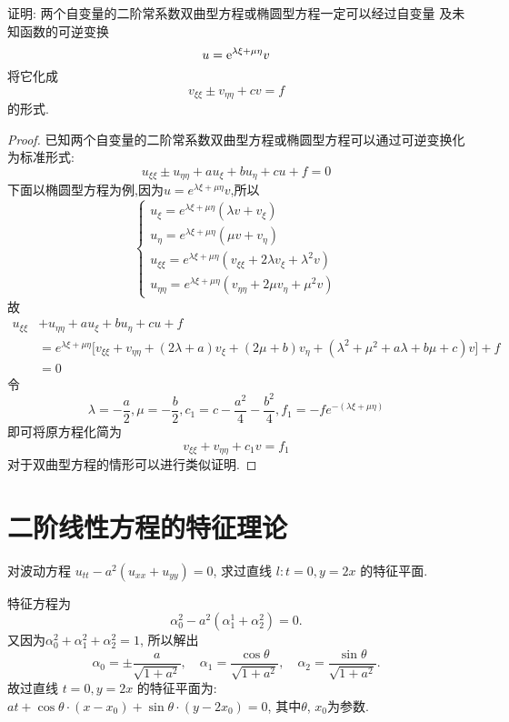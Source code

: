 \begin{exercise}
  证明: 两个自变量的二阶常系数双曲型方程或椭圆型方程一定可以经过自变量
  及未知函数的可逆变换
  \[u = \mathrm{e}^{\lambda\xi + \mu\eta} v\]
  将它化成
  \[v_{\xi\xi} \pm v_{\eta\eta} + cv = f\]
  的形式.
\end{exercise}

\begin{proof}
  已知两个自变量的二阶常系数双曲型方程或椭圆型方程可以通过可逆变换化为标准形式:
  \[u_{\xi\xi}\pm u_{\eta\eta}+au_{\xi}+bu_{\eta}+cu+f=0\]
  下面以椭圆型方程为例,因为$u=e^{\lambda\xi+\mu\eta}v$,所以
  \[\begin{cases}
  u_{\xi}=e^{\lambda\xi+\mu\eta}(\lambda v+v_{\xi})\\
  u_{\eta}=e^{\lambda\xi+\mu\eta}(\mu v+v_{\eta})\\
  u_{\xi\xi}=e^{\lambda\xi+\mu\eta}(v_{\xi\xi}+2\lambda v_{\xi}+\lambda^2v)\\
  u_{\eta\eta}=e^{\lambda\xi+\mu\eta}(v_{\eta\eta}+2\mu v_{\eta}+\mu^2v)
  \end{cases}\]
  故
  \[\begin{split}
  u_{\xi\xi}&+u_{\eta\eta}+au_{\xi}+bu_{\eta}+cu+f\\
  &=e^{\lambda\xi+\mu\eta}\big[v_{\xi\xi}+v_{\eta\eta}+(2\lambda+a)v_{\xi}+(2\mu+b)v_{\eta}+(\lambda^2+\mu^2+a\lambda+b\mu+c)v\big]+f\\
  &=0
  \end{split}\]
  令\[\lambda=-\frac{a}{2},\mu=-\frac{b}{2},c_1=c-\frac{a^2}{4}-\frac{b^2}{4},f_1=-fe^{-(\lambda\xi+\mu\eta)}\]
  即可将原方程化简为
  \[v_{\xi\xi}+v_{\eta\eta}+c_1v=f_1\]
  对于双曲型方程的情形可以进行类似证明.
\end{proof}


\section{二阶线性方程的特征理论}

\begin{exercise}
  对波动方程 $u_{tt} - a^2(u_{xx}+u_{yy}) = 0$, 求过直线 $l: t = 0, y = 2x$ 的特征平面.
\end{exercise}

\begin{solve}
  特征方程为
  \[\alpha_0^2-a^2(\alpha_1^1+\alpha_2^2) = 0.\]
  又因为$\alpha_0^2+\alpha_1^2+\alpha_2^2=1$, 所以解出
  \[\alpha_0 = \pm\frac{a}{\sqrt{1+a^2}},
    \quad \alpha_1=\frac{\cos\theta}{\sqrt{1+a^2}},
    \quad \alpha_2=\frac{\sin\theta}{\sqrt{1+a^2}}.\]
  故过直线 $t=0,y=2x$ 的特征平面为: $at+\cos\theta\cdot(x-x_0)+\sin\theta\cdot(y-2x_0)=0$,
  其中$\theta$, $x_0$为参数.
\end{solve}


